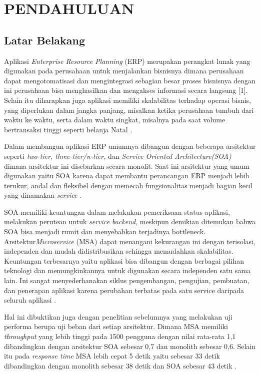 \chapter{PENDAHULUAN}
\section{Latar Belakang}
Aplikasi \textit{Enterprise Resource Planning} (ERP) merupakan perangkat lunak yang digunakan pada perusahaan untuk menjalankan bisnisnya dimana perusahaan dapat mengotomatisasi dan mengintegrasi sebagian besar proses bisnisnya dengan ini perusahaan bisa menghasilkan dan mengakses informasi secara langsung [1]. Selain itu diharapkan juga aplikasi memiliki skalabilitas terhadap operasi bisnis, yang diperlukan dalam jangka panjang, misalkan ketika perusahaan tumbuh dari waktu ke waktu, serta dalam waktu singkat, misalnya pada saat volume bertransaksi tinggi seperti belanja Natal \cite{1}.

Dalam membangun aplikasi ERP umumnya dibangun dengan beberapa arsitektur seperti \textit{ two-tier, three-tier/n-tier,} dan \textit{Service Oriented Architecture(SOA)} dimana arsitektur ini disebarkan secara monolit. Saat ini arsitektur yang umum digunakan yaitu SOA karena dapat membantu perancangan ERP menjadi lebih terukur, andal dan fleksibel dengan memecah fungsionalitas menjadi bagian kecil yang dinamakan \textit{service} \cite{1}.

SOA memiliki keuntungan dalam melakukan pemeriksaan status aplikasi, melakukan perutean untuk \textit{service backend}, meskipun demikian ditemukan bahwa SOA bisa menjadi rumit dan menyebabkan terjadinya bottleneck. Arsitektur\textit{Microservice} (MSA) dapat menangani kekurangan ini dengan terisolasi, independen dan mudah didistribusikan sehingga memudahkan skalabilitas. Keuntungan terbesarnya yaitu aplikasi bisa dibangun dengan berbagai pilihan teknologi dan memungkinkannya untuk digunakan secara independen satu sama lain. Ini sangat menyederhanakan siklus pengembangan, pengujian, pembuatan, dan penerapan aplikasi karena perubahan terbatas pada satu service daripada seluruh aplikasi \cite{3}.

Hal ini dibuktikan juga dengan penelitian sebelumnya yang melakukan uji performa berupa uji beban dari setiap arsitektur. Dimana MSA memiliki \textit{throughput} yang lebih tinggi pada 1500 pengguna dengan nilai rata-rata 1,1 dibandingkan dengan arsitektur SOA sebesar 0,7 dan monolith sebesar 0,6. Selain itu pada \textit{response time} MSA lebih cepat 5 detik yaitu sebesar 33 detik dibandingkan dengan monolith sebesar 38 detik dan SOA sebesar 43 detik \cite{4}.

